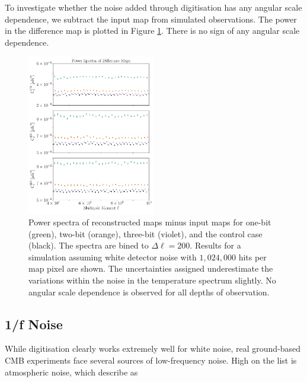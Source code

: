 \documentclass[apj]{emulateapj}
\begin{document}
To investigate whether the noise added through digitisation has any angular scale dependence, we subtract the input map from simulated observations. The power in the difference map is plotted in Figure \ref{fig:diffpswn}. There is no sign of any angular scale dependence.


\begin{figure}[htb]\centering
\includegraphics[width=0.5\textwidth,clip]{Plots/diffwn.pdf}
  \caption[Current ]{
  Power spectra of reconstructed maps minus input maps for one-bit (green), two-bit (orange), three-bit (violet), and the control case (black). The spectra are bined to $\Delta \ell = 200$. Results for a simulation assuming white detector noise with $1,024,000$ hits per map pixel are shown. The uncertainties assigned underestimate the variations within the noise in the temperature spectrum slightly. No angular scale dependence is observed for all depths of observation.
\label{fig:diffpswn}
}
\end{figure}

\subsection{1/f Noise}
\label{subsec:oofnoise}

While digitisation clearly works extremely well for white noise, real ground-based CMB experiments face several sources of low-frequency noise. High on the list is atmospheric noise, which \cite{lay2000} describe as
\end{document}
